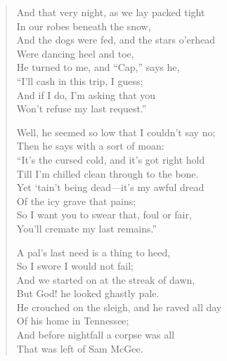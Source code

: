 \begin{verse}
And that very night, as we lay packed tight\\
\hspace*{2em}In our robes beneath the snow,\\
And the dogs were fed, and the stars o’erhead\\
\hspace*{2em}Were dancing heel and toe,\\
He turned to me, and “Cap,” says he,\\
\hspace*{2em}“I’ll cash in this trip, I guess;\\
And if I do, I’m asking that you\\
\hspace*{2em}Won’t refuse my last request.”

Well, he seemed so low that I couldn’t say no;\\
\hspace*{2em}Then he says with a sort of moan:\\
“It’s the cursed cold, and it’s got right hold\\
\hspace*{2em}Till I’m chilled clean through to the bone.\\
Yet ‘tain’t being dead—it’s my awful dread\\
\hspace*{2em}Of the icy grave that pains;\\
So I want you to swear that, foul or fair,\\
\hspace*{2em}You’ll cremate my last remains.”

A pal’s last need is a thing to heed,\\
\hspace*{2em}So I swore I would not fail;\\
And we started on at the streak of dawn,\\
\hspace*{2em}But God! he looked ghastly pale.\\
He crouched on the sleigh, and he raved all day\\
\hspace*{2em}Of his home in Tennessee;\\
And before nightfall a corpse was all\\
\hspace*{2em}That was left of Sam McGee.


\end{verse}
